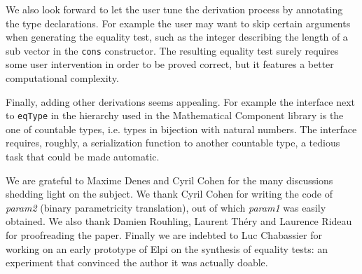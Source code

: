 \documentclass[a4paper,UKenglish,cleveref, autoref]{lipics-v2019}
\newcommand{\derive}[1]{\emph{#1}}
\begin{document}
We also look forward to let the user tune
the derivation process by annotating the type declarations.
For example the user may want to skip
certain arguments when generating the equality test, such as the
integer describing the length of a sub vector in the \lstinline+cons+
constructor. The resulting equality
test surely requires some user intervention in order 
to be proved correct, but it features a better computational complexity.

Finally, adding other derivations seems appealing. For example
the interface next to \lstinline+eqType+ in the hierarchy used
in the Mathematical Component library is the one of countable types,
i.e. types in bijection with natural numbers. The interface
requires, roughly, a serialization function to another countable
type, a tedious task that could be made automatic.

We are grateful to Maxime Denes and Cyril Cohen for the many discussions
shedding light on the subject. We thank Cyril Cohen for writing the code 
of \derive{param2} (binary parametricity translation), out of which
\derive{param1} was easily obtained.  
We also thank Damien Rouhling, Laurent Th\'ery and Laurence Rideau
for proofreading the paper.
Finally we are indebted
to Luc Chabassier for working on an early prototype of Elpi on
the synthesis of equality tests: an experiment that convinced
the author it was actually doable.





\end{document}

